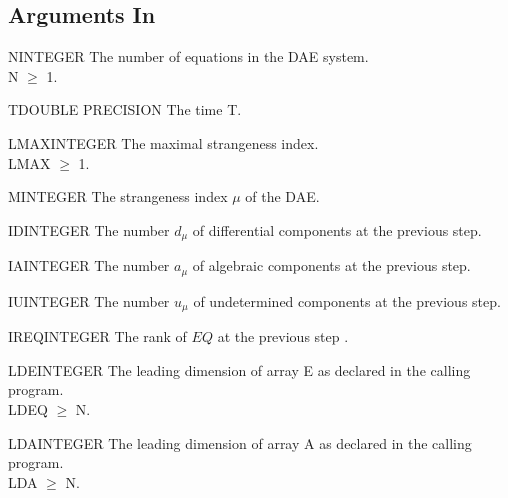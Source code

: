 \subsection{Arguments In}

\begin{entry}{N}{INTEGER}
  The number of equations in the DAE system. \\
  N $\ge$ 1.
\end{entry}

\begin{entry}{T}{DOUBLE PRECISION}
  The time T.
\end{entry}

\begin{entry}{LMAX}{INTEGER}
  The maximal strangeness index.\\
  LMAX $\ge$ 1.
\end{entry}

\begin{entry}{M}{INTEGER}
  The strangeness index $\mu$ of the DAE.
\end{entry}

\begin{entry}{ID}{INTEGER}
  The number $d_{\mu}$ of differential components at the previous step.
\end{entry}

\begin{entry}{IA}{INTEGER}
  The number $a_{\mu}$ of algebraic components at the previous step.
\end{entry}

\begin{entry}{IU}{INTEGER}
  The number $u_{\mu}$ of undetermined components at the previous step.
\end{entry}

\begin{entry}{IREQ}{INTEGER}
  The rank of $EQ$ at the previous step .
\end{entry}

\begin{entry}{LDE}{INTEGER}
  The leading dimension of array E as declared in the calling program.\\
  LDEQ $\ge $ N.
\end{entry}

\begin{entry}{LDA}{INTEGER}
  The leading dimension of array A as declared in the calling program.\\
  LDA $\ge$ N.
\end{entry}

